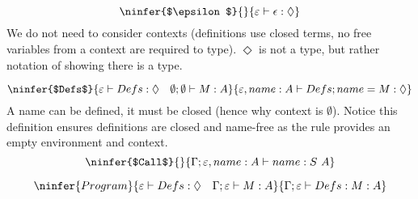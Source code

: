 \[\ninfer{$\epsilon$}{}{\varepsilon \vdash \epsilon : \Diamond}\]
We do not need to consider contexts (definitions use closed terms, no free variables from a context are required to type). $\Diamond$ is not a type, but rather notation of showing there is a type.

\[\ninfer{$Defs$}{\varepsilon \vdash Defs : \Diamond \quad \emptyset ; \emptyset \vdash M : A}{\varepsilon, name:A \vdash Defs;name = M : \Diamond}\]
A name can be defined, it must be closed (hence why context is $\emptyset$). Notice this definition ensures definitions are closed and name-free as the rule provides an empty environment and context.
\[\ninfer{$Call$}{}{\Gamma ; \varepsilon , name : A \vdash name : S \ A}\]

\[\ninfer{Program}{\varepsilon \vdash Defs : \Diamond \quad \Gamma ; \varepsilon \vdash M : A}{\Gamma ; \varepsilon \vdash Defs : M : A}\]

